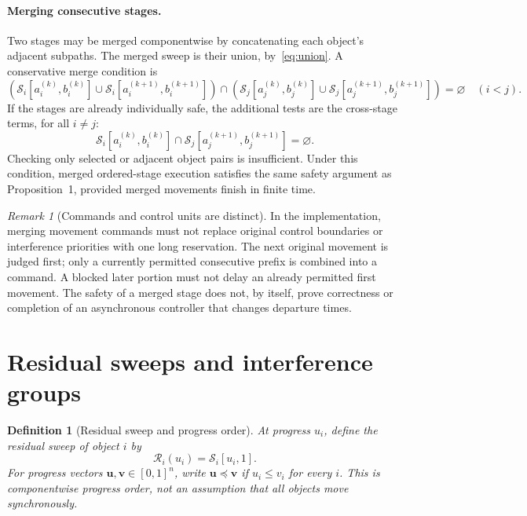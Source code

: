\documentclass[11pt,a4paper]{article}
\newtheorem{definition}{Definition}
\theoremstyle{remark}
\newtheorem{remark}{Remark}
\newcommand{\Sweep}{\mathcal S}
\newcommand{\remSweep}{\mathcal R}
\newcommand{\up}{\boldsymbol u}
\newcommand{\vp}{\boldsymbol v}
\begin{document}
\paragraph{Merging consecutive stages.}
Two stages may be merged componentwise by concatenating each object's
adjacent subpaths. The merged sweep is their union, by~\eqref{eq:union}.
A conservative merge condition is
\begin{equation}
 \left(\Sweep_i[a_i^{(k)},b_i^{(k)}]\cup
       \Sweep_i[a_i^{(k+1)},b_i^{(k+1)}]\right)
 \cap
 \left(\Sweep_j[a_j^{(k)},b_j^{(k)}]\cup
       \Sweep_j[a_j^{(k+1)},b_j^{(k+1)}]\right)=\varnothing
 \quad(i<j).
 \label{eq:merge}
\end{equation}
If the stages are already individually safe, the additional tests are the
cross-stage terms, for all $i\ne j$:
\begin{equation}
 \Sweep_i[a_i^{(k)},b_i^{(k)}]\cap
 \Sweep_j[a_j^{(k+1)},b_j^{(k+1)}]=\varnothing.
 \label{eq:cross}
\end{equation}
Checking only selected or adjacent object pairs is insufficient. Under this
condition, merged ordered-stage execution satisfies the same safety argument
as Proposition~1, provided merged movements finish in finite time.

\begin{remark}[Commands and control units are distinct]
In the implementation, merging movement commands must not replace original
control boundaries or interference priorities with one long reservation.
The next original movement is judged first; only a currently permitted
consecutive prefix is combined into a command. A blocked later portion must
not delay an already permitted first movement. The safety of a merged stage
does not, by itself, prove correctness or completion of an asynchronous
controller that changes departure times.
\end{remark}

\section{Residual sweeps and interference groups}

\begin{definition}[Residual sweep and progress order]
At progress $u_i$, define the residual sweep of object $i$ by
\begin{equation}
 \remSweep_i(u_i)=\Sweep_i[u_i,1].
 \label{eq:residual}
\end{equation}
For progress vectors $\up,\vp\in[0,1]^n$, write $\up\preceq\vp$ if
$u_i\le v_i$ for every $i$. This is componentwise progress order, not an
assumption that all objects move synchronously.
\end{definition}
\end{document}
